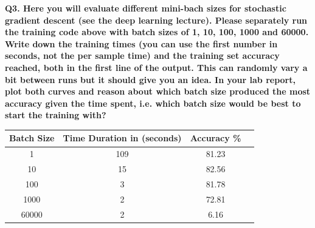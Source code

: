 \documentclass[a4paper,10pt]{article}
\begin{document}
\textbf{Q3. Here you will evaluate different mini-bach sizes for stochastic gradient descent (see the deep learning lecture). 
Please separately run the training code above with batch sizes of 1, 10, 100, 1000 and 60000. 
Write down the training times (you can use the first number in seconds, not the per sample time) and 
the training set accuracy reached, both in the first line of the output. 
This can randomly vary a bit between runs but it should give you an idea. 
In your lab report, plot both curves and reason about which batch size produced the most accuracy 
given the time spent, i.e. which batch size would be best to start the training with?}


\begin{center}
	\setlength{\arrayrulewidth}{1.0pt}
	\begin{tabular}{|c|c|c|c|}
		\hline
		 \textbf{Batch Size} & \textbf{Time Duration in (seconds)} & \textbf{Accuracy \%}\\ [1.5ex]
		\hline
		1 & 109 &81.23\\
		\hline
		10 & 15 &82.56\\
		\hline
		100 & 3 &81.78\\
		\hline
		1000 & 2 &72.81\\
		\hline
		60000 & 2 &6.16\\
		\hline
	\end{tabular}
\end{center}
\end{document}

